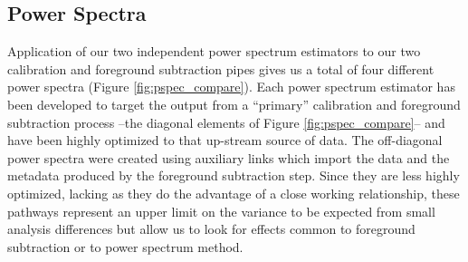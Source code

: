 \documentclass[preprint2]{aastex}
\begin{document}
%


\subsection{Power Spectra}

Application of our two independent power spectrum estimators to our two calibration and foreground subtraction pipes gives us a total of four different power spectra (Figure \ref{fig:pspec_compare}).  Each power spectrum estimator has been developed to target the output from a ``primary'' calibration and foreground subtraction process --the diagonal elements of Figure \ref{fig:pspec_compare}-- and have been highly optimized to that up-stream source of data.  The off-diagonal power spectra were created using auxiliary links which import the data and the metadata produced by the foreground subtraction step.  Since they are less highly optimized, lacking as they do the advantage of a close working relationship, these pathways represent an upper limit on the variance to be expected from small analysis differences but allow us to look for effects common to foreground subtraction or to power spectrum method.
\end{document}
